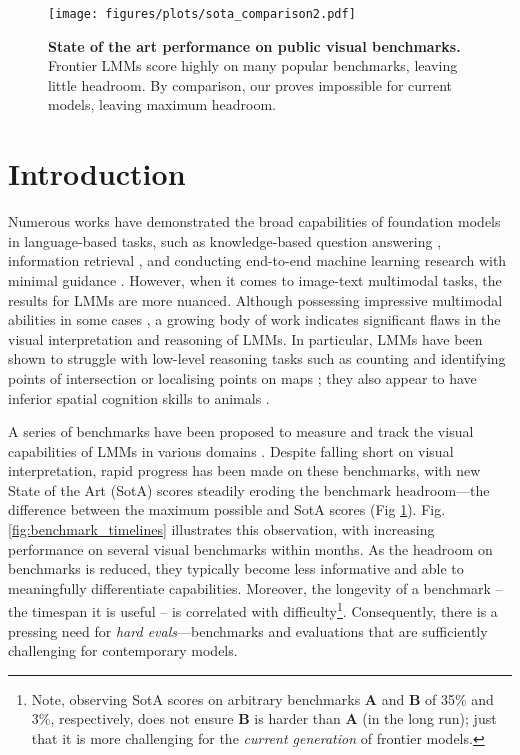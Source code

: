 \begin{figure}[th!]
        \centering
        \texttt{[image: figures/plots/sota\_comparison2.pdf]}
        \vspace{-0.8cm} %
        \caption{\textbf{State of the art performance on public visual benchmarks.} Frontier LMMs score highly on many popular benchmarks, leaving little headroom. By comparison, our \benchmarkName proves impossible for current models, leaving maximum headroom. %
        }
        \label{fig:sota_comparison}
\end{figure}


\section{Introduction}
\label{sec:introduction}



Numerous works have demonstrated the broad capabilities of foundation models in language-based tasks, such as knowledge-based question answering \cite{hendrycks2020measuring}, information retrieval \cite{kamradt2023LLMTest}, and %
conducting end-to-end machine learning research with minimal guidance \cite{schmidgall2025agent}. However, when it comes to image-text multimodal tasks, the results for LMMs are more nuanced. Although possessing impressive multimodal abilities in some cases \cite{yang2023dawn}, a growing body of work indicates significant flaws in the visual interpretation and reasoning of LMMs. In particular, LMMs have been shown to struggle with low-level reasoning tasks such as counting and identifying points of intersection \cite{rahmanzadehgervi2024vision} or localising points on maps \cite{roberts2024charting}; they also appear to have inferior spatial cognition skills to animals \cite{ramakrishnan2024does}. 




A series of benchmarks have been proposed to measure and track the visual capabilities of LMMs in various domains \cite{ramakrishnan2024does, rahmanzadehgervi2024vision, padlewski2024vibe}. Despite falling short on visual interpretation, rapid progress has been made on these benchmarks, with new State of the Art (SotA) scores steadily eroding the benchmark headroom---the difference between the maximum possible and SotA scores (Fig \ref{fig:sota_comparison}). Fig. \ref{fig:benchmark_timelines} illustrates this observation, with increasing performance on several visual benchmarks within months. As the headroom on benchmarks is reduced, they typically become less informative and able to meaningfully differentiate  capabilities. Moreover, the longevity of a benchmark -- the timespan it is useful -- is correlated with difficulty\footnote[2]{Note, observing SotA scores on arbitrary benchmarks \textbf{A} and \textbf{B} of 35\% and 3\%, respectively, does not ensure \textbf{B} is harder than \textbf{A} (in the long run); just that it is more challenging for the \textit{current generation} of frontier models.}. Consequently, there is a pressing need for \textit{hard evals}---benchmarks and evaluations that are sufficiently challenging for contemporary models. 

